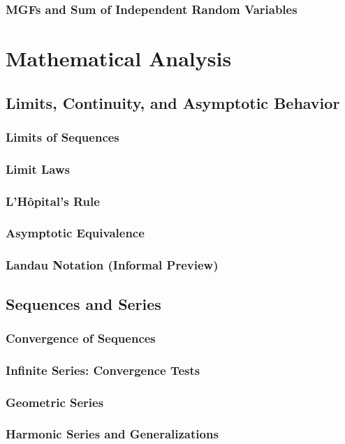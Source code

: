 \subsubsection{MGFs and Sum of Independent Random Variables}

\section{Mathematical Analysis}
\subsection{Limits, Continuity, and Asymptotic Behavior}
\subsubsection{Limits of Sequences}
\subsubsection{Limit Laws}
\subsubsection{L'Hôpital's Rule}
\subsubsection{Asymptotic Equivalence}
\subsubsection{Landau Notation (Informal Preview)}

\subsection{Sequences and Series}
\subsubsection{Convergence of Sequences}
\subsubsection{Infinite Series: Convergence Tests}
\subsubsection{Geometric Series}
\subsubsection{Harmonic Series and Generalizations}

